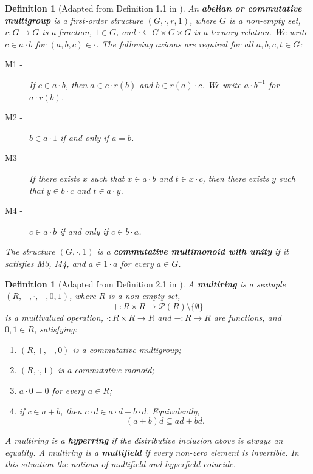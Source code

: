 \documentclass[a4paper,10pt]{article}
\newtheorem{defn}[teo]{Definition}
\begin{document}
\begin{defn}[Adapted from Definition 1.1 in \cite{marshall2006real}]\label{defn:multimonoid}
An \textbf{abelian or commutative multigroup} is a first-order structure $(G,\cdot,r,1)$, where $G$ is a non-empty set, $r:G\rightarrow G$ is a function, $1\in G$, and $\cdot\subseteq G\times G\times G$ is a ternary relation.  We write $c\in a\cdot b$ for $(a,b,c)\in\cdot$.  The following axioms are required for all $a,b,c,t\in G$:
\begin{description}
    \item[M1 -] If $c\in a\cdot b$, then $a\in c\cdot r(b)$ and $b\in r(a)\cdot c$.  We write $a\cdot b^{-1}$ for $a\cdot r(b)$.
    \item[M2 -] $b\in a\cdot1$ if and only if $a=b$.
    \item[M3 -] If there exists $x$ such that $x\in a\cdot b$ and $t\in x\cdot c$, then there exists $y$ such that $y\in b\cdot c$ and $t\in a\cdot y$.
    \item[M4 -] $c\in a\cdot b$ if and only if $c\in b\cdot a$.
\end{description}
The structure $(G,\cdot,1)$ is a \textbf{commutative multimonoid with unity} if it satisfies M3, M4, and $a\in1\cdot a$ for every $a\in G$.
\end{defn}

\begin{defn}[Adapted from Definition 2.1 in \cite{marshall2006real}]\label{defn:multiring}
A \textbf{multiring} is a sextuple $(R,+,\cdot,-,0,1)$, where $R$ is a non-empty set,
\[
        +:R\times R\rightarrow\mathcal P(R)\setminus\{\emptyset\}
\]
is a multivalued operation, $\cdot:R\times R\rightarrow R$ and $-:R\rightarrow R$ are functions, and $0,1\in R$, satisfying:
\begin{enumerate}[i -]
    \item $(R,+,-,0)$ is a commutative multigroup;
    \item $(R,\cdot,1)$ is a commutative monoid;
    \item $a\cdot0=0$ for every $a\in R$;
    \item if $c\in a+b$, then $c\cdot d\in a\cdot d+b\cdot d$.  Equivalently,
    \[
        (a+b)d\subseteq ad+bd.
    \]
\end{enumerate}
A multiring is a \textbf{hyperring} if the distributive inclusion above is always an equality.  A multiring is a \textbf{multifield} if every non-zero element is invertible.  In this situation the notions of multifield and hyperfield coincide.
\end{defn}
\end{document}
